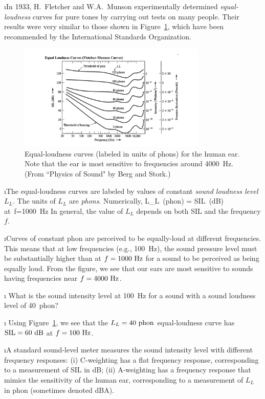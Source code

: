 \i In 1933, H.~Fletcher and W.A.~Munson experimentally 
determined {\em equal-loudness} curves for pure 
tones by carrying out tests on many people.
Their results were very similar to those shown
in Figure~\ref{f:equal-loudness}, which have been
recommended by the International Standards Organization.
%
\begin{figure}[htbp]
\begin{center}
\includegraphics[width=0.8\textwidth]{fletcher-munson}
\caption{Equal-loudness curves (labeled in units of phons) 
for the human ear.
Note that the ear is most sensitive to frequencies around 4000~Hz.
(From ``Physics of Sound" by Berg and Stork.)}
\label{f:equal-loudness}
\end{center}
\end{figure}
%

\i The equal-loudness curves are labeled by values of
constant {\em sound loudness level} $L_L$.
The units of $L_L$ are {\em phons}.
Numerically, 
%
\be
L_L\ ({\rm phon}) = {\rm SIL}\ ({\rm dB})
\quad
{\rm at}\  f=1000~{\rm Hz}
\ee
%
In general, the value of $L_L$ depends on both SIL 
and the frequency $f$.

\i Curves of constant phon are perceived to be 
equally-loud at different frequencies.
This means that at low frequencies (e.g., 100~Hz), 
the sound pressure
level must be substantially higher than at 
$f=1000~{\rm Hz}$ for a sound to be perceived as being
equally loud.
From the figure, we see that our ears are most sensitive 
to sounds having frequencies near $f=4000~{\rm Hz}$.

\i \exer 
What is the sound intensity level at 100~Hz for a 
sound with a sound loudness level of 40~phon?

\i \ans 
Using Figure~\ref{f:equal-loudness}, we see that
the $L_L=40~{\rm phon}$ equal-loudness curve has
${\rm SIL}=60~{\rm dB}$ at $f=100~{\rm Hz}$.

\i A standard sound-level meter measures the sound 
intensity level with different frequency responses:
(i) C-weighting has a flat frequency response, 
corresponding to a measurement of SIL in dB;
(ii) A-weighting has a frequency response that mimics
the sensitivity of the human ear, corresponding to a
measurement of $L_L$ in phon (sometimes denoted dBA).

